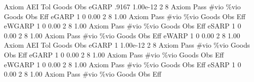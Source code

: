 {\smallskip}
       Axiom {\VBAR}       AEI        Tol      Goods        Obs 
       eGARP {\VBAR}     .9167   1.00e-12          2          8 
{\smallskip}
{\smallskip}
{\smallskip}
       Axiom {\VBAR} Pass        \#vio        \%vio       Goods         Obs         Eff  
       eGARP {\VBAR}    1           0        0.00           2           8        1.00  
{\smallskip}
{\smallskip}
{\smallskip}
       Axiom {\VBAR} Pass        \#vio        \%vio       Goods         Obs         Eff  
      eWGARP {\VBAR}    1           0        0.00           2           8        1.00  
{\smallskip}
{\smallskip}
{\smallskip}
       Axiom {\VBAR} Pass        \#vio        \%vio       Goods         Obs         Eff  
       eSARP {\VBAR}    1           0        0.00           2           8        1.00  
{\smallskip}
{\smallskip}
{\smallskip}
       Axiom {\VBAR} Pass        \#vio        \%vio       Goods         Obs         Eff  
       eWARP {\VBAR}    1           0        0.00           2           8        1.00  
{\smallskip}
       Axiom {\VBAR}       AEI        Tol      Goods        Obs 
       eGARP {\VBAR}         1   1.00e-12          2          8 
{\smallskip}
{\smallskip}
{\smallskip}
       Axiom {\VBAR} Pass        \#vio        \%vio       Goods         Obs         Eff  
       eGARP {\VBAR}    1           0        0.00           2           8        1.00  
{\smallskip}
{\smallskip}
{\smallskip}
       Axiom {\VBAR} Pass        \#vio        \%vio       Goods         Obs         Eff  
      eWGARP {\VBAR}    1           0        0.00           2           8        1.00  
{\smallskip}
{\smallskip}
{\smallskip}
       Axiom {\VBAR} Pass        \#vio        \%vio       Goods         Obs         Eff  
       eSARP {\VBAR}    1           0        0.00           2           8        1.00  
{\smallskip}
{\smallskip}
{\smallskip}
       Axiom {\VBAR} Pass        \#vio        \%vio       Goods         Obs         Eff  
